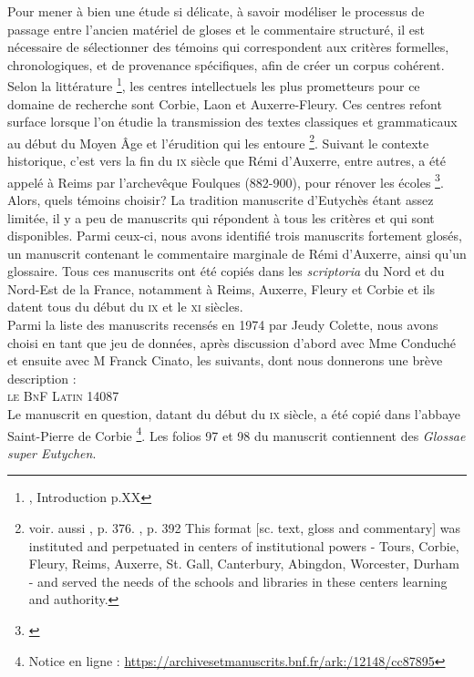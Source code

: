 \documentclass[a4paper, twoside, 12pt]{book}
\begin{document}
Pour mener à bien une étude si délicate, à savoir modéliser le processus de passage entre l'ancien matériel de gloses et le commentaire structuré, il est nécessaire de sélectionner des témoins qui correspondent aux critères formelles, chronologiques, et de provenance spécifiques, afin de créer un corpus cohérent.\\

Selon la littérature \footnote{\cite{oSullivanglossae}, Introduction p.XX}, les centres intellectuels les plus prometteurs pour ce domaine de recherche sont Corbie, Laon et Auxerre-Fleury. Ces centres refont surface lorsque l'on étudie la transmission des textes classiques et grammaticaux au début du Moyen Âge et l'érudition qui les entoure \footnote{voir. aussi \cite{oSullivan2017lemma}, p. 376. \cite{irvine1994making}, p. 392 \og{}This format [sc. text, gloss and commentary] was instituted and perpetuated in centers of institutional powers - Tours, Corbie, Fleury, Reims, Auxerre, St. Gall, Canterbury, Abingdon, Worcester, Durham - and served the needs of the schools and libraries in these centers learning and authority.\fg{}}. Suivant le contexte historique, c’est vers la fin du \textsc{ix}\ieme{} siècle que Rémi d'Auxerre, entre autres, a été appelé à Reims par l'archevêque Foulques (882-900), pour rénover les écoles \footnote{\cite{jeudy1974manuscrits}}.\\

Alors, quels témoins choisir? La tradition manuscrite d'Eutychès étant assez limitée, il y a peu de manuscrits qui répondent à tous les critères et qui sont disponibles. Parmi ceux-ci, nous avons identifié trois manuscrits fortement glosés, un manuscrit contenant le commentaire marginale de Rémi d'Auxerre, ainsi qu'un glossaire. Tous ces manuscrits ont été copiés dans les\textit{ scriptoria} du Nord et du Nord-Est de la France, notamment à Reims, Auxerre, Fleury et Corbie et ils datent tous du début du \textsc{ix}\ieme{} et le \textsc{xi}\ieme{} siècles.\\

Parmi la liste des manuscrits recensés en 1974 par Jeudy Colette, nous avons choisi en tant que jeu de données, après discussion d'abord avec Mme Conduché et ensuite avec M Franck Cinato, les suivants, dont nous donnerons une brève description :\\


\textsc{le BnF Latin 14087} \\


Le manuscrit en question, datant du début du \textsc{ix}\ieme{} siècle, a été copié dans l'abbaye Saint-Pierre de Corbie \footnote{Notice en ligne : \url{https://archivesetmanuscrits.bnf.fr/ark:/12148/cc87895}}. Les folios 97 et 98 du manuscrit contiennent des \textit{Glossae super Eutychen}.\\
\end{document}
